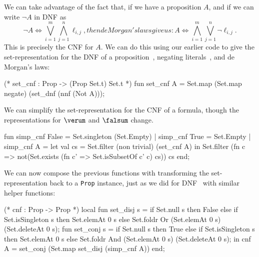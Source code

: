 \begin{node}
\begin{definition}
\begin{node}\label{prop:normal-form-000E}%
\begin{node}\label{prop:normal-form-000H}%
We can take advantage of the fact that, if we have a proposition $A$,
and if we can write $\neg A$ in DNF as
\begin{subequations}
\begin{equation}
\neg A\iff\bigvee^{m}_{i=1}\bigwedge^{n}_{j=1}\ell_{i,j},
\end{equation}
then de Morgan's laws give us:
\begin{equation}
A \iff\bigwedge^{m}_{i=1}\bigvee^{n}_{j=1}\neg\ell_{i,j}.
\end{equation}
\end{subequations}
This is precisely the CNF for $A$. We can do this using our earlier code
to give the set-representation for the DNF of a proposition~,
negating literals~, and de Morgan's laws:
\begin{sml}
(* set_cnf : Prop -> (Prop Set.t) Set.t *)
fun set_cnf A = Set.map (Set.map negate) (set_dnf (nnf (Not A)));
\end{sml}
\end{node}

\begin{node}[Simplification]\label{prop:normal-form-000I}%
We can simplify the set-representation for the CNF of a formula, though
the representations for $\verum$ and $\falsum$ change.
\begin{sml}
fun simp_cnf False = Set.singleton (Set.Empty)
 |  simp_cnf True = Set.Empty
 |  simp_cnf A = let val cs = Set.filter (non trivial) (set_cnf A)
                 in Set.filter (fn c =>
                                  not(Set.exists (fn c' =>
                                                    Set.isSubsetOf c' c)
                                                 cs))
                               cs
                 end;
\end{sml}
\end{node}

\begin{node}\label{prop:normal-form-000J}%
We can now compose the previous functions with transforming the
set-representation back to a \lstinline[basicstyle=\color{sbase03}\ttfamily\small,language=SML]{Prop}
instance, just as we did for DNF~ with
similar helper functions:
\begin{sml}
(* cnf : Prop -> Prop *)
local
  fun set_disj s = if Set.null s
                   then False
                   else if Set.isSingleton s
                   then Set.elemAt 0 s
                   else Set.foldr Or (Set.elemAt 0 s) (Set.deleteAt 0 s);
  fun set_conj s = if Set.null s
                   then True
                   else if Set.isSingleton s
                   then Set.elemAt 0 s
                   else Set.foldr And (Set.elemAt 0 s) (Set.deleteAt 0 s);
in
  cnf A = set_conj (Set.map set_disj (simp_cnf A))
end;
\end{sml}
\end{node}


\end{node}
\end{definition}
\end{node}
